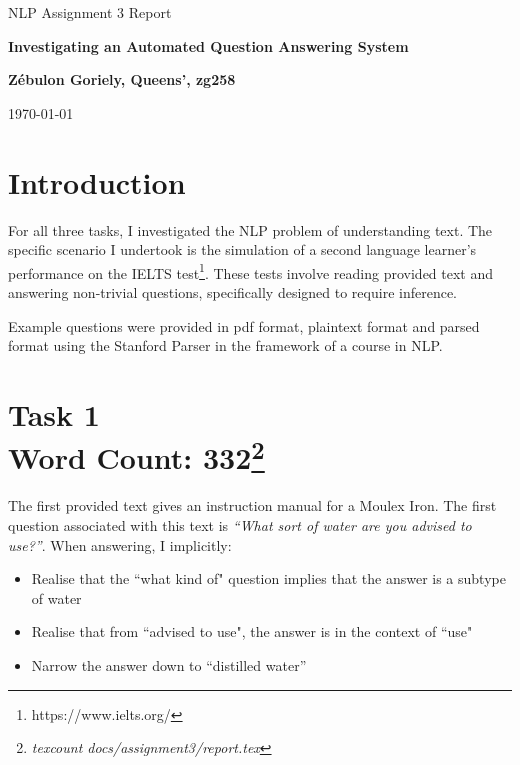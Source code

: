 \documentclass[12pt]{article}
\begin{document}
\centerline{\large NLP Assignment 3 Report}
\vspace{0.1in}
\centerline{\Large\bf Investigating an Automated Question Answering System}
\vspace{0.1in}
\centerline{\large {\bf{Z\'ebulon Goriely, Queens', zg258}}}
\vspace{0.1in}
\centerline{\large {\today}}
\vspace{0.05in}

\makeatletter
\newenvironment{tablehere}
  {\def\@captype{table}}
  {}

\newenvironment{figurehere}
  {\def\@captype{figure}}
  {}
\makeatother

\section*{Introduction}

For all three tasks, I investigated the NLP problem of understanding text. The specific scenario I undertook is the simulation of a second language learner's performance on the IELTS test\footnote{https://www.ielts.org/}. These tests involve reading provided text and answering non-trivial questions, specifically designed to require inference.

Example questions were provided in pdf format, plaintext format and parsed format using the Stanford Parser \citep{chen2014fast} in the framework of a course in NLP.

\section*{Task 1 \\ \small Word Count: 332\footnote{\emph{texcount docs/assignment3/report.tex}}}

The first provided text gives an instruction manual for a Moulex Iron. The first question associated with this text is \emph{``What sort of water are you advised to use?''}. When answering, I implicitly:
\begin{itemize}
  \item Realise that the ``what kind of" question implies that the answer is a subtype of water
  \item Realise that from ``advised to use", the answer is in the context of ``use"
  \item Narrow the answer down to ``distilled water''
\end{itemize}
\end{document}
